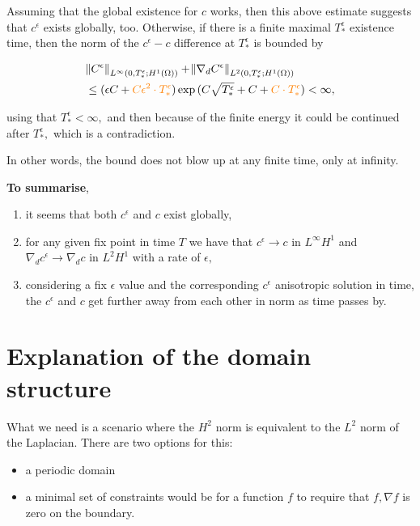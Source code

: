 \documentclass[11pt]{article}
\begin{document}
Assuming that the global existence for $c$ works, then this above estimate suggests that $c^\epsilon$ exists globally, too. Otherwise, if there is a finite maximal $T^\epsilon_*$ existence time, then the norm of the $c^\epsilon - c$ difference at $T^\epsilon_*$ is bounded by

\begin{equation}
  \begin{split}
  & \norm{C^\epsilon}_{L^\infty(0,T^\epsilon_*; H^1(\Omega))} + \norm{\nabla_d C^\epsilon}_{L^2(0,T^\epsilon_*; H^1(\Omega))} \\
  & \leq (\epsilon C + \textcolor{orange}{C \epsilon^2 \cdot T^\epsilon_*}) \exp{(C \sqrt{T^\epsilon_*} + C + \textcolor{orange}{C \cdot T^\epsilon_*})} < \infty,
  \end{split}
\end{equation}

using that $T^\epsilon_* < \infty,$ and then because of the finite energy it could be continued after $T^\epsilon_*,$ which is a contradiction.

In other words, the bound does not blow up at any finite time, only at infinity.

\textbf{To summarise},
\begin{enumerate}
  \item it seems that both $c^\epsilon$ and $c$ exist globally,
  \item for any given fix point in time $T$ we have that $c^\epsilon \to c$ in $L^\infty H^1$ and $\nabla_d c^\epsilon \to \nabla_d c$ in $L^2 H^1$ with a rate of $\epsilon,$
  \item considering a fix $\epsilon$ value and the corresponding $c^\epsilon$ anisotropic solution in time, the $c^\epsilon$ and $c$ get further away from each other in norm as time passes by.
\end{enumerate}

\section{Explanation of the domain structure}

What we need is a scenario where the $H^2$ norm is equivalent to the $L^2$ norm of the Laplacian. There are two options for this:
\begin{itemize}
  \item a periodic domain
  \item a minimal set of constraints would be for a function $f$ to require that $f, \nabla f$ is zero on the boundary.
\end{itemize}
\end{document}
